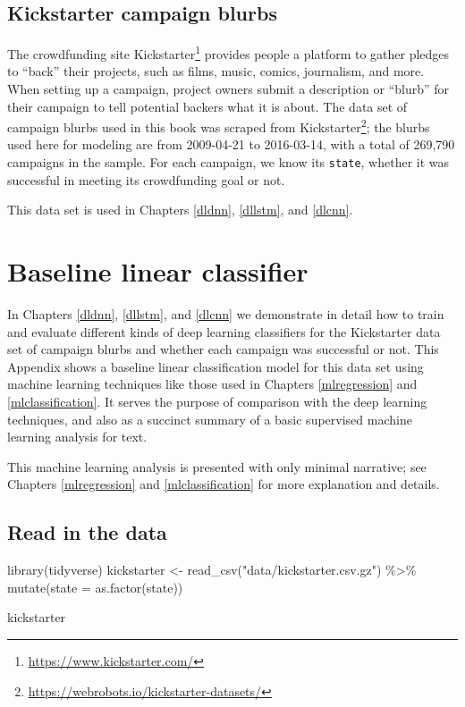 \documentclass[
]{krantz}
\makeatletter
\newenvironment{Shaded}{\begin{snugshade}}{\end{snugshade}}
\newcommand{\AttributeTok}[1]{\textcolor[rgb]{0.77,0.63,0.00}{#1}}
\newcommand{\FunctionTok}[1]{\textcolor[rgb]{0.00,0.00,0.00}{#1}}
\newcommand{\NormalTok}[1]{#1}
\newcommand{\OtherTok}[1]{\textcolor[rgb]{0.56,0.35,0.01}{#1}}
\newcommand{\SpecialCharTok}[1]{\textcolor[rgb]{0.00,0.00,0.00}{#1}}
\newcommand{\StringTok}[1]{\textcolor[rgb]{0.31,0.60,0.02}{#1}}
\DeclareRobustCommand{\href}[2]{#2\footnote{\url{#1}}}
\renewcommand{\href}[2]{#2\footnote{\url{#1}}}
\newenvironment{kframe}{%
\medskip{}
\setlength{\fboxsep}{.8em}
 \def\at@end@of@kframe{}%
 \ifinner\ifhmode%
  \def\at@end@of@kframe{\end{minipage}}%
  \begin{minipage}{\columnwidth}%
 \fi\fi%
 \def\FrameCommand##1{\hskip\@totalleftmargin \hskip-\fboxsep
 \colorbox{shadecolor}{##1}\hskip-\fboxsep
     \hskip-\linewidth \hskip-\@totalleftmargin \hskip\columnwidth}%
 \MakeFramed {\advance\hsize-\width
   \@totalleftmargin\z@ \linewidth\hsize
   \@setminipage}}%
 {\par\unskip\endMakeFramed%
 \at@end@of@kframe}
\renewenvironment{Shaded}{\begin{kframe}}{\end{kframe}}
\makeatother
\begin{document}
\hypertarget{kickstarter-blurbs}{%
\section{Kickstarter campaign blurbs}\label{kickstarter-blurbs}}

The crowdfunding site \href{https://www.kickstarter.com/}{Kickstarter} provides people a platform to gather pledges to ``back'' their projects, such as films, music, comics, journalism, and more. When setting up a campaign, project owners submit a description or ``blurb'' for their campaign to tell potential backers what it is about. The data set of campaign blurbs used in this book \href{https://webrobots.io/kickstarter-datasets/}{was scraped from Kickstarter}; the blurbs used here for modeling are from 2009-04-21 to 2016-03-14, with a total of 269,790 campaigns in the sample. For each campaign, we know its \texttt{state}, whether it was successful in meeting its crowdfunding goal or not.

This data set is used in Chapters \ref{dldnn}, \ref{dllstm}, and \ref{dlcnn}.

\hypertarget{appendixbaseline}{%
\chapter{Baseline linear classifier}\label{appendixbaseline}}

In Chapters \ref{dldnn}, \ref{dllstm}, and \ref{dlcnn} we demonstrate in detail how to train and evaluate different kinds of deep learning classifiers for the Kickstarter data set of campaign blurbs and whether each campaign was successful or not. This Appendix shows a baseline linear classification model for this data set using machine learning techniques like those used in Chapters \ref{mlregression} and \ref{mlclassification}. It serves the purpose of comparison with the deep learning techniques, and also as a succinct summary of a basic supervised machine learning analysis for text.

This machine learning analysis is presented with only minimal narrative; see Chapters \ref{mlregression} and \ref{mlclassification} for more explanation and details.

\hypertarget{read-in-the-data}{%
\section{Read in the data}\label{read-in-the-data}}

\begin{Shaded}
\begin{Highlighting}[]
\FunctionTok{library}\NormalTok{(tidyverse)}
\NormalTok{kickstarter }\OtherTok{\textless{}{-}} \FunctionTok{read\_csv}\NormalTok{(}\StringTok{"data/kickstarter.csv.gz"}\NormalTok{) }\SpecialCharTok{\%\textgreater{}\%}
  \FunctionTok{mutate}\NormalTok{(}\AttributeTok{state =} \FunctionTok{as.factor}\NormalTok{(state))}

\NormalTok{kickstarter}
\end{Highlighting}
\end{Shaded}
\end{document}
